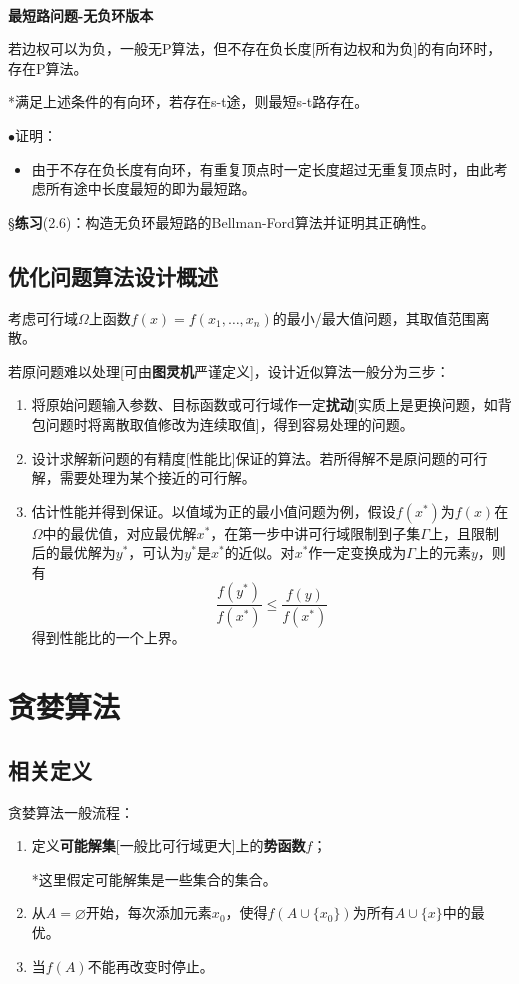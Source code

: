\documentclass[a4paper,UTF8,fontset=windows]{ctexart}
\newcommand{\exce}[2]{\S\textbf{练习}(#1)：{\kaishu #2}}
\newcommand{\proo}[1]{{\kaishu $\bullet$证明：
\begin{itemize}
    \item[] #1
\end{itemize}
}}
\begin{document}
\

\textbf{最短路问题-无负环版本}

若边权可以为负，一般无P算法，但不存在负长度[所有边权和为负]的有向环时，存在P算法。

*满足上述条件的有向环，若存在s-t途，则最短s-t路存在。

\proo{
    由于不存在负长度有向环，有重复顶点时一定长度超过无重复顶点时，由此考虑所有途中长度最短的即为最短路。
}

\exce{2.6}{构造无负环最短路的Bellman-Ford算法并证明其正确性。}

\subsection{优化问题算法设计概述}
考虑可行域$\Omega$上函数$f(x)=f(x_1,\dots,x_n)$的最小/最大值问题，其取值范围离散。

若原问题难以处理[可由\textbf{图灵机}严谨定义]，设计近似算法一般分为三步：
\begin{enumerate}
    \item 将原始问题输入参数、目标函数或可行域作一定\textbf{扰动}[实质上是更换问题，如背包问题时将离散取值修改为连续取值]，得到容易处理的问题。
    \item 设计求解新问题的有精度[性能比]保证的算法。若所得解不是原问题的可行解，需要处理为某个接近的可行解。
    \item 估计性能并得到保证。以值域为正的最小值问题为例，假设$f(x^*)$为$f(x)$在$\Omega$中的最优值，对应最优解$x^*$，在第一步中讲可行域限制到子集$\Gamma$上，且限制后的最优解为$y^*$，可认为$y^*$是$x^*$的近似。对$x^*$作一定变换成为$\Gamma$上的元素$y$，则有
    $$\frac{f(y^*)}{f(x^*)}\le\frac{f(y)}{f(x^*)}$$
    得到性能比的一个上界。
\end{enumerate}

\section{贪婪算法}
\subsection{相关定义}
贪婪算法一般流程：
\begin{enumerate}
    \item 定义\textbf{可能解集}[一般比可行域更大]上的\textbf{势函数}$f$；
    
    *这里假定可能解集是一些集合的集合。

    \item 从$A=\varnothing$开始，每次添加元素$x_0$，使得$f(A\cup\{x_0\})$为所有$A\cup\{x\}$中的最优。
    \item 当$f(A)$不能再改变时停止。
\end{enumerate}
\end{document}
